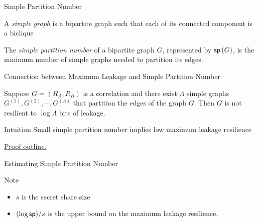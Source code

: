 \begin{frame}{Simple Partition Number}
	\begin{definition}
		A \textit{simple graph} is a bipartite graph such that each of its
		connected component is a biclique
	\end{definition}
	\pause
	\begin{definition}
		The \textit{simple partition number} of a bipartite graph $G$, represented
		by $\sp G$, is the minimum number of simple graphs needed to
		partition its edges.
	\end{definition}
	\pause
	
\end{frame}

\begin{frame}{Connection between Maximum Leakage and Simple Partition Number}
	\begin{lemma}
		Suppose $ G = (R_A, R_B) $ is a correlation and there exist $\Lambda$ simple graphs $ G^{(1)}, G^{(2)}, \cdots, G^{(\Lambda)} $ that partition the edges of the graph $ G $. 
		Then $ G $ is not resilient to $ \log \Lambda $ bits of leakage.
	\end{lemma}
	\pause
	
	\begin{block}{Intuition}
		Small simple partition number implies low maximum leakage resilience
	\end{block}
	\pause
	\underline{Proof outline.} 

\end{frame}

\begin{frame}{Estimating Simple Partition Number}
	
	{
		\begin{block}{Note}
			\begin{itemize}
				\item $ s $ is the secret share size
				\item $ (\log \pred{sp})/s $ is the upper bound on the maximum leakage resilience.
			\end{itemize}
		\end{block}
	}
\end{frame}

